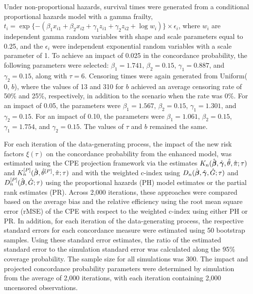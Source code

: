 \documentclass[12pt]{article}
\newcommand{\bg}{\mbox{\boldmath $\gamma$}}
\newcommand{\bb}{\mbox{\boldmath $\beta$}}
\begin{document}
Under non-proportional hazards, survival times were generated from a conditional proportional hazards model with a gamma frailty, $t_i = \exp\{-(\beta_1x_{i1}+\beta_2 x_{i2}+\gamma_1 z_{i1}+\gamma_2 z_{i2} + \log w_i) \} \times \epsilon_i$, where $w_i$ are independent gamma random variables with shape and scale parameters equal to 0.25, and the $\epsilon_i$ were independent exponential random variables with a scale parameter of 1. To achieve an impact of 0.025 in the concordance probability, the following parameters were selected: $\beta_1= 1.741$, $\beta_2=0.15$, $\gamma_1=0.887$, and $\gamma_2=0.15$, along with $\tau=6$. Censoring times were again generated from Uniform($0$, $b$), where the values of 13 and 310 for $b$ achieved an average censoring rate of 50\% and 25\%, respectively, in addition to the scenario when the rate was 0\%. For an impact of 0.05, the parameters were $\beta_1=1.567$, $\beta_2=0.15$, $\gamma_1=1.301$, and $\gamma_2=0.15$.  For an impact of 0.10, the parameters were $\beta_1=1.061$, $\beta_2=0.15$, $\gamma_1=1.754$, and $\gamma_2=0.15$. The values of $\tau$ and $b$ remained the same. 

For each iteration of the data-generating process, the impact of the new risk factors $\xi(\tau)$ on the concordance probability from the enhanced model, was estimated using the CPE projection framework via the estimates $K_n(\hat{\bb},\hat{\bg}, \hat{\theta},\hat{\pi}; \tau)$ and $K_n^{[P]}(\hat{\bb}, \hat{\theta}^{[P]},\hat{\pi}; \tau)$ and with the weighted c-index using $D_n(\hat{\bb}, \hat{\bg}, \hat{G}; \tau)$ and $D_n^{[P]}(\hat{\bb}, \hat{G}; \tau)$ using the proportional hazards (PH) model estimates or the partial rank estimates (PR).  Across 2,000 iterations, these approaches were compared based on the average bias and the relative efficiency using the root mean square error (rMSE) of the CPE with respect to the weighted c-index using either PH or PR. In addition, for each iteration of the data-generating process, the respective standard errors for each concordance measure were estimated using 50 bootstrap samples. Using these standard error estimates, the ratio of the estimated standard error to the simulation standard error was calculated along the 95\% coverage probability. The sample size for all simulations was 300. The impact and projected concordance probability parameters were determined by simulation from the average of 2,000 iterations, with each iteration containing 2,000 uncensored observations.
\end{document}
